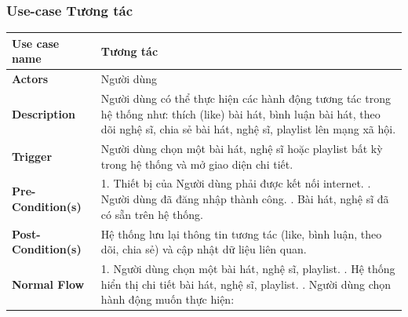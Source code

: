 \documentclass[a4paper]{article}
\begin{document}
\subsubsection{Use-case Tương tác}
\begin{table}[H]
	\centering
	\renewcommand{\arraystretch}{1.3} %
	\begin{tabularx}{\textwidth}{|l|X|}
		\hline
		\textbf{Use case name} & Tương tác                                                                                                                                                                              \\ \hline
		\textbf{Actors}        & Người dùng                                                                                                                                                                             \\ \hline
		\textbf{Description}   & Người dùng có thể thực hiện các hành động tương tác trong hệ thống như: thích (like) bài hát, bình luận bài hát, theo dõi nghệ sĩ, chia sẻ bài hát, nghệ sĩ, playlist lên mạng xã hội. \\ \hline
		\textbf{Trigger}       & Người dùng chọn một bài hát, nghệ sĩ hoặc playlist bất kỳ trong hệ thống và mở giao diện chi tiết.                                                                                     \\ \hline
		\textbf{Pre-Condition(s)}
		                       & 1. Thiết bị của Người dùng phải được kết nối internet. \newline
		2. Người dùng đã đăng nhập thành công. \newline
		3. Bài hát, nghệ sĩ đã có sẵn trên hệ thống.                                                                                                                                                                    \\ \hline
		\textbf{Post-Condition(s)}
		                       & Hệ thống lưu lại thông tin tương tác (like, bình luận, theo dõi, chia sẻ) và cập nhật dữ liệu liên quan.                                                                               \\ \hline
		\textbf{Normal Flow}
		                       & 1. Người dùng chọn một bài hát, nghệ sĩ, playlist. \newline
		2. Hệ thống hiển thị chi tiết bài hát, nghệ sĩ, playlist. \newline
		3. Người dùng chọn hành động muốn thực hiện: \newline

\end{tabularx}
\end{table}
\end{document}
